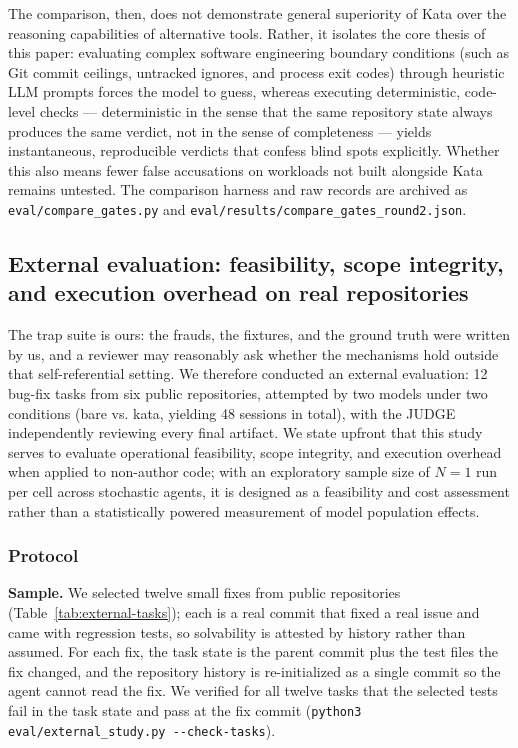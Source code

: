 \documentclass{sbc2019}%
\begin{document}
The comparison, then, does not demonstrate general superiority of Kata over the reasoning capabilities of alternative tools. Rather, it isolates the core thesis of this paper: evaluating complex software engineering boundary conditions (such as Git commit ceilings, untracked ignores, and process exit codes) through heuristic LLM prompts forces the model to guess, whereas executing deterministic, code-level checks --- deterministic in the sense that the same repository state always produces the same verdict, not in the sense of completeness --- yields instantaneous, reproducible verdicts that confess blind spots explicitly. Whether this also means fewer false accusations on workloads not built alongside Kata remains untested. The comparison harness and raw records are archived as \texttt{eval/compare\_gates.py} and \texttt{eval/results/compare\_gates\_round2.json}.

\subsection{External evaluation: feasibility, scope integrity, and execution overhead on real repositories}
\label{sec:external-evaluation}

The trap suite is ours: the frauds, the fixtures, and the ground truth
were written by us, and a reviewer may reasonably ask whether the
mechanisms hold outside that self-referential setting. We therefore conducted
an external evaluation: 12 bug-fix tasks from six public repositories, attempted
by two models under two conditions (bare vs. kata, yielding 48 sessions in
total), with the JUDGE independently reviewing every final artifact. We state
upfront that this study serves to evaluate operational feasibility, scope
integrity, and execution overhead when applied to non-author code; with an
exploratory sample size of $N=1$ run per cell across stochastic agents, it is
designed as a feasibility and cost assessment rather than a statistically
powered measurement of model population effects.

\subsubsection{Protocol}

\textbf{Sample.} We selected twelve small fixes from public repositories
(Table~\ref{tab:external-tasks}); each is a real commit that fixed a real
issue and came with regression tests, so solvability is attested by history
rather than assumed. For each fix, the task state is the parent commit plus
the test files the fix changed, and the repository history is
re-initialized as a single commit so the agent cannot read the fix. We
verified for all twelve tasks that the selected tests fail in the task
state and pass at the fix commit (\texttt{python3
eval/external\_study.py -{}-check-tasks}).
\end{document}
